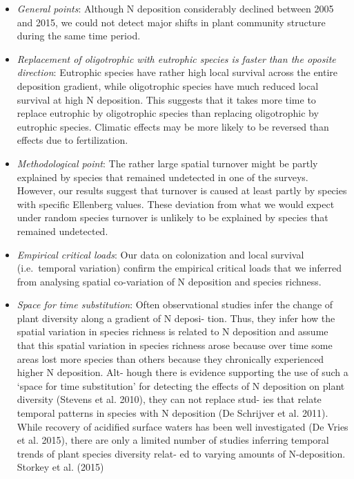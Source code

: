 \documentclass[fleqn,10pt,lineno]{wlpeerj} %
\theoremstyle{definition}
\theoremstyle{definition}
\theoremstyle{definition}
\theoremstyle{remark}
\begin{document}
\begin{itemize}
\item
  \emph{General points}: Although N deposition considerably declined
  between 2005 and 2015, we could not detect major shifts in plant
  community structure during the same time period.
\item
  \emph{Replacement of oligotrophic with eutrophic species is faster
  than the oposite direction}: Eutrophic species have rather high local
  survival across the entire deposition gradient, while oligotrophic
  species have much reduced local survival at high N deposition. This
  suggests that it takes more time to replace eutrophic by oligotrophic
  species than replacing oligotrophic by eutrophic species. Climatic
  effects may be more likely to be reversed than effects due to
  fertilization.
\item
  \emph{Methodological point}: The rather large spatial turnover might
  be partly explained by species that remained undetected in one of the
  surveys. However, our results suggest that turnover is caused at least
  partly by species with specific Ellenberg values. These deviation from
  what we would expect under random species turnover is unlikely to be
  explained by species that remained undetected.
\item
  \emph{Empirical critical loads}: Our data on colonization and local
  survival (i.e.~temporal variation) confirm the empirical critical
  loads that we inferred from analysing spatial co-variation of N
  deposition and species richness.
\item
  \emph{Space for time substitution}: Often observational studies infer
  the change of plant diversity along a gradient of N deposi- tion.
  Thus, they infer how the spatial variation in species richness is
  related to N deposition and assume that this spatial variation in
  species richness arose because over time some areas lost more species
  than others because they chronically experienced higher N deposition.
  Alt- hough there is evidence supporting the use of such a `space for
  time substitution' for detecting the effects of N deposition on plant
  diversity (Stevens et al. 2010), they can not replace stud- ies that
  relate temporal patterns in species with N deposition (De Schrijver et
  al. 2011). While recovery of acidified surface waters has been well
  investigated (De Vries et al. 2015), there are only a limited number
  of studies inferring temporal trends of plant species diversity relat-
  ed to varying amounts of N-deposition. Storkey et al. (2015)

\end{itemize}
\end{document}
